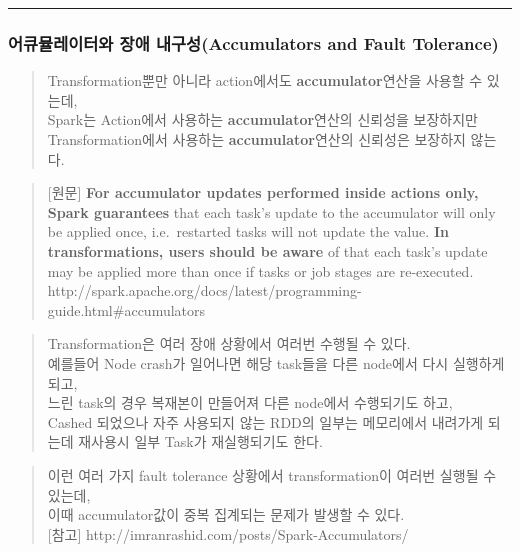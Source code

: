 \documentclass[11pt]{article}
\begin{document}
    \begin{center}\rule{3in}{0.4pt}\end{center}

    \subsubsection{어큐뮬레이터와 장애 내구성(Accumulators and Fault
Tolerance)}\label{uxc5b4uxd050uxbbacuxb808uxc774uxd130uxc640-uxc7a5uxc560-uxb0b4uxad6cuxc131accumulators-and-fault-tolerance}

    \begin{quote}
Transformation뿐만 아니라 action에서도 \textbf{accumulator}연산을 사용할
수 있는데,\\Spark는 Action에서 사용하는 \textbf{accumulator}연산의
신뢰성을 보장하지만\\Transformation에서 사용하는
\textbf{accumulator}연산의 신뢰성은 보장하지 않는다.
\end{quote}

\begin{quote}
{[}원문{]} \textbf{For accumulator updates performed inside actions
only, Spark guarantees} that each task's update to the accumulator will
only be applied once, i.e.~restarted tasks will not update the value.
\textbf{In transformations, users should be aware} of that each task's
update may be applied more than once if tasks or job stages are
re-executed.\\http://spark.apache.org/docs/latest/programming-guide.html\#accumulators
\end{quote}

    \begin{quote}
Transformation은 여러 장애 상황에서 여러번 수행될 수 있다.\\예를들어
Node crash가 일어나면 해당 task들을 다른 node에서 다시 실행하게
되고,\\느린 task의 경우 복재본이 만들어져 다른 node에서 수행되기도
하고,\\Cashed 되었으나 자주 사용되지 않는 RDD의 일부는 메모리에서
내려가게 되는데 재사용시 일부 Task가 재실행되기도 한다.
\end{quote}

\begin{quote}
이런 여러 가지 fault tolerance 상황에서 transformation이 여러번 실행될
수 있는데,\\이때 accumulator값이 중복 집계되는 문제가 발생할 수
있다.\\{[}참고{]} http://imranrashid.com/posts/Spark-Accumulators/
\end{quote}
\end{document}
